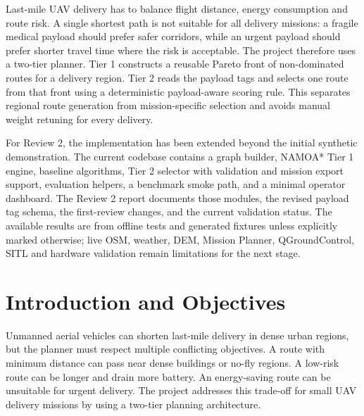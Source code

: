 \documentclass{ssnreview}
\begin{document}
\makereviewtitle
\reviewfrontmatter

\begin{reviewabstract}
Last-mile UAV delivery has to balance flight distance, energy consumption and route risk. A single shortest path is
not suitable for all delivery missions: a fragile medical payload should prefer safer corridors, while an urgent
payload should prefer shorter travel time where the risk is acceptable. The project therefore uses a two-tier
planner. Tier 1 constructs a reusable Pareto front of non-dominated routes for a delivery region. Tier 2 reads the
payload tags and selects one route from that front using a deterministic payload-aware scoring rule. This separates
regional route generation from mission-specific selection and avoids manual weight retuning for every delivery.

For Review 2, the implementation has been extended beyond the initial synthetic demonstration. The current codebase
contains a graph builder, NAMOA* Tier 1 engine, baseline algorithms, Tier 2 selector with validation and mission
export support, evaluation helpers, a benchmark smoke path, and a minimal operator dashboard. The Review 2 report
documents those modules, the revised payload tag schema, the first-review changes, and the current validation status.
The available results are from offline tests and generated fixtures unless explicitly marked otherwise; live OSM,
weather, DEM, Mission Planner, QGroundControl, SITL and hardware validation remain limitations for the next stage.

\end{reviewabstract}

\chapter{Introduction and Objectives}
Unmanned aerial vehicles can shorten last-mile delivery in dense urban regions, but the planner must respect multiple
conflicting objectives. A route with minimum distance can pass near dense buildings or no-fly regions. A low-risk
route can be longer and drain more battery. An energy-saving route can be unsuitable for urgent delivery. The project
addresses this trade-off for small UAV delivery missions by using a two-tier planning architecture.
\end{document}
